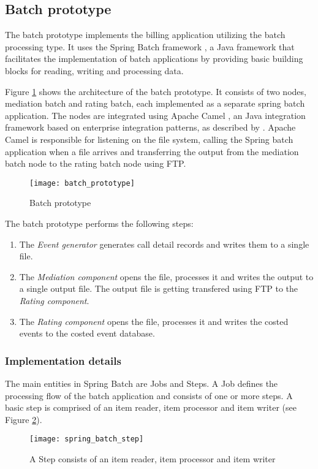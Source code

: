 \subsection{Batch prototype}
The batch prototype implements the billing application utilizing the batch processing type. It uses the Spring Batch framework \citep{springbatch}, a Java framework that facilitates the implementation of batch applications by providing basic building blocks for reading, writing and processing data.

Figure \ref{fig:ch4_batch_prototype} shows the architecture of the batch prototype. It consists of two nodes, mediation batch and rating batch, each implemented as a separate spring batch application. The nodes are integrated using Apache Camel \citep{apachecamel}, an Java integration framework based on enterprise integration patterns, as described by \cite{Hohpe:2003fk}. Apache Camel is responsible for listening on the file system, calling the Spring batch application when a file arrives and transferring the output from the mediation batch node to the rating batch node using \ac{FTP}.

\begin{figure}[h!]
	\centering
	\texttt{[image: batch\_prototype]}
	\caption{Batch prototype}
	\label{fig:ch4_batch_prototype}
\end{figure}

The batch prototype performs the following steps:
\begin{enumerate}
	\item The \emph{Event generator} generates call detail records and writes them to a single file.
	\item The \emph{Mediation component} opens the file, processes it and writes the output to a single output file. The output file is getting transfered using \ac{FTP} to the \emph{Rating component}.
	\item The \emph{Rating component} opens the file, processes it and writes the costed events to the costed event database.
\end{enumerate}

\subsubsection{Implementation details}
The main entities in Spring Batch are Jobs and Steps. A Job defines the processing flow of the batch application and consists of one or more steps. A basic step is comprised of an item reader, item processor and item writer (see Figure \ref{fig:ch4_spring_batch_step}). 
\begin{figure}[h!]
	\centering
	\texttt{[image: spring\_batch\_step]}
	\caption{A Step consists of an item reader, item processor and item writer}
	\label{fig:ch4_spring_batch_step}
\end{figure}

